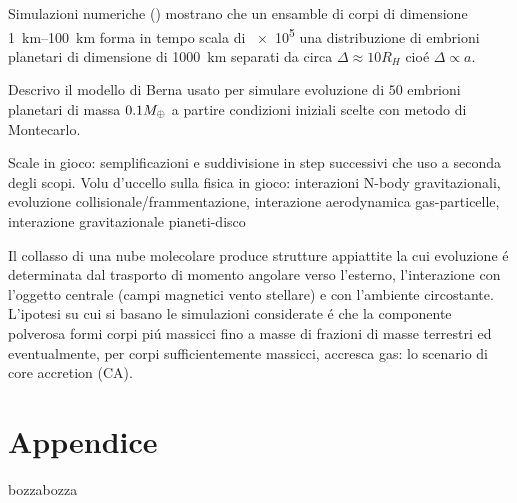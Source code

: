 \documentclass[twoside,11pt,fleqn]{memoir}%
\def\versione{bozza}%
\def\bozza{bozza}
\begin{document}
Simulazioni numeriche (\cite{kokubo2012dynamics}) mostrano che un ensamble di corpi di dimensione \SIrange{1}{100}{\kilo\meter} forma in tempo scala di \SI{e5}{\year} una distribuzione di embrioni planetari di dimensione di \SI{1000}{\kilo\meter} separati da circa $\Delta\approx10R_H$ cio\'e $\Delta\propto a$.

Descrivo il modello di Berna usato per simulare evoluzione di $50$ embrioni planetari di massa $0.1M_{\oplus}{}$ a partire condizioni iniziali scelte con metodo di Montecarlo.


\begin{workout}
Scale in gioco: semplificazioni e suddivisione in step successivi che uso a seconda degli scopi.
Volu d'uccello sulla fisica in gioco: interazioni N-body gravitazionali, evoluzione collisionale/frammentazione, interazione aerodynamica gas-particelle, interazione gravitazionale pianeti-disco
\end{workout}

\begin{errata}
	Il collasso di una nube molecolare produce strutture appiattite la cui evoluzione \'e determinata dal trasporto di momento angolare verso l'esterno, l'interazione con l'oggetto centrale (campi magnetici vento stellare) e con l'ambiente circostante.
	L'ipotesi su cui si basano le simulazioni considerate \'e che la componente polverosa formi corpi pi\'u massicci fino a masse di frazioni di masse terrestri  ed eventualmente, per corpi sufficientemente massicci, accresca gas: lo scenario di core accretion (CA).
\end{errata}



\cleartorecto




{\let\clearpage\relax\let\cleardoublepage\relax
\backmatter
}

\appendix
\part{Appendice}

\printbibliography
\ifx\versione\bozza
\erratac
\fi
\end{document}
